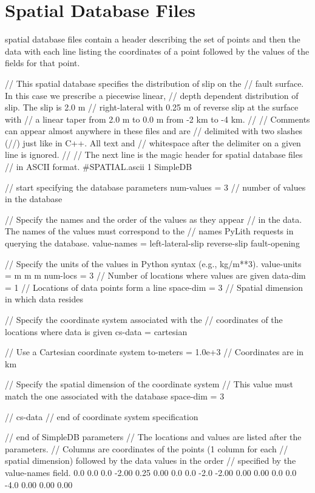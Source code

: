 \section{ Spatial Database Files}
\label{sec:format:SimpleIOAscii}

 spatial database files contain a header describing
the set of points and then the data with each line listing the
coordinates of a point followed by the values of the fields for that
point.

\begin{SimpleIOAscii}
// This spatial database specifies the distribution of slip on the
// fault surface. In this case we prescribe a piecewise linear, 
// depth dependent distribution of slip. The slip is 2.0 m 
// right-lateral with 0.25 m of reverse slip at the surface with
// a linear taper from 2.0 m to 0.0 m from -2 km to -4 km.
//
// Comments can appear almost anywhere in these files and are
// delimited with two slashes (//) just like in C++. All text and 
// whitespace after the delimiter on a given line is ignored.
//
// The next line is the magic header for spatial database files 
// in ASCII format.
#SPATIAL.ascii 1
SimpleDB { // start specifying the database parameters
  num-values = 3 // number of values in the database

  // Specify the names and the order of the values as they appear 
  // in the data. The names of the values must correspond to the 
  // names PyLith requests in querying the database.
  value-names =  left-lateral-slip  reverse-slip  fault-opening

  // Specify the units of the values in Python syntax (e.g., kg/m**3).
  value-units =  m  m  m
  num-locs = 3 // Number of locations where values are given
  data-dim = 1 // Locations of data points form a line
  space-dim = 3 // Spatial dimension in which data resides

  // Specify the coordinate system associated with the 
  // coordinates of the locations where data is given
  cs-data = cartesian { // Use a Cartesian coordinate system
    to-meters = 1.0e+3 // Coordinates are in km

    // Specify the spatial dimension of the coordinate system
    // This value must match the one associated with the database
    space-dim = 3

  } // cs-data // end of coordinate system specification

} // end of SimpleDB parameters
// The locations and values are listed after the parameters.
// Columns are coordinates of the points (1 column for each 
// spatial dimension) followed by the data values in the order 
// specified by the value-names field.
0.0  0.0  0.0    -2.00  0.25  0.00
0.0  0.0 -2.0    -2.00  0.00  0.00
0.0  0.0 -4.0     0.00  0.00  0.00
\end{SimpleIOAscii}

